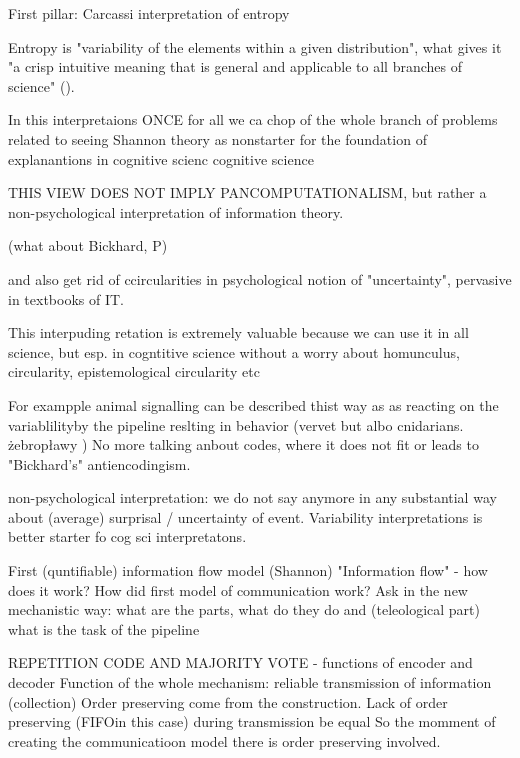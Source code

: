 \documentclass[10pt, aspectratio=169]{beamer}
\begin{document}
\begin{frame} {First pillar: Carcassi interpretation of entropy}

Entropy is "variability of the elements within a given distribution", what gives it "a crisp intuitive meaning that is general and applicable to all branches of science" (\cite{carcassi_variability_2021}).

In this interpretaions ONCE for all we ca chop of the whole branch of problems related to seeing Shannon theory as nonstarter for the foundation of explanantions in cognitive scienc  cognitive science


THIS VIEW DOES NOT IMPLY PANCOMPUTATIONALISM, but rather a non-psychological interpretation of information theory.

(what about Bickhard, P)

and also get rid of ccircularities in psychological notion of "uncertainty", pervasive in textbooks of IT.

This interpuding retation is extremely valuable because we can use it in all science, but esp. in cogntitive science without a worry about homunculus, circularity, epistemological circularity etc

For exampple animal signalling can be described thist way as as reacting on the variablilityby the pipeline reslting in behavior (vervet but albo cnidarians. żebropławy )
No more talking anbout codes, where it does not fit or leads to "Bickhard's" antiencodingism. 

non-psychological interpretation: we do not say anymore in any substantial way about (average) surprisal / uncertainty of event.
Variability interpretations is better starter fo cog sci interpretatons.
 

\end{frame}



\begin{frame} {First (quntifiable) information flow model (Shannon)}
    "Information flow" - how does it work?
    How did first model of communication work?
    Ask in the new mechanistic way: what are the parts, what do they do and (teleological part) what is the task of the pipeline

    REPETITION CODE AND MAJORITY VOTE - functions of encoder and decoder 
    Function of the whole mechanism: reliable transmission of information (collection)
    Order preserving come from the construction.
    Lack of order preserving (FIFOin this case) during transmission  be equal 
    So the momment of creating the communicatioon model there is order preserving involved.
     
\end{frame}
\end{document}
